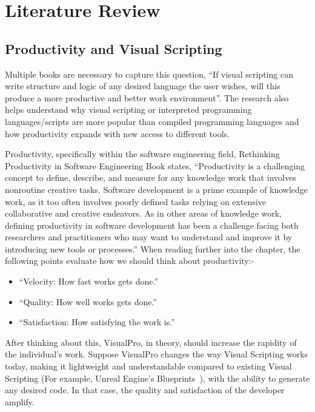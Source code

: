 \documentclass[conference]{IEEEtran}
\begin{document}
    \section{Literature Review}
    \label{sec:literatureReview}
      \subsection{Productivity and Visual Scripting}
        Multiple books are necessary to capture this question, ``If visual scripting can write structure and logic of any desired language the user wishes, will this produce a more productive and better work environment''. The research also helps understand why visual scripting or interpreted programming languages/scripts are more popular than compiled programming languages and how productivity expands with new access to different tools.

        Productivity, specifically within the software engineering field, Rethinking Productivity in Software Engineering Book states, ``Productivity is a challenging concept to define, describe, and measure for any knowledge work that involves nonroutine creative tasks. Software development is a prime example of knowledge work, as it too often involves poorly defined tasks relying on extensive collaborative and creative endeavors. As in other areas of knowledge work, defining productivity in software development has been a challenge facing both researchers and practitioners who may want to understand and improve it by introducing new tools or processes.'' When reading further into the chapter, the following points evaluate how we should think about productivity:-

        \begin{itemize}
          \item ``Velocity: How fast works gets done.''
          \item ``Quality: How well works gets done.''
          \item ``Satisfaction: How satisfying the work is.''
        \end{itemize}

        After thinking about this, VisualPro, in theory, should increase the rapidity of the individual’s work. Suppose VisualPro changes the way Visual Scripting works today, making it lightweight and understandable compared to existing Visual Scripting (For example, Unreal Engine's Blueprints~\cite{unreal_engine_introduction_nodate}), with the ability to generate any desired code. In that case, the quality and satisfaction of the developer amplify.
\end{document}
